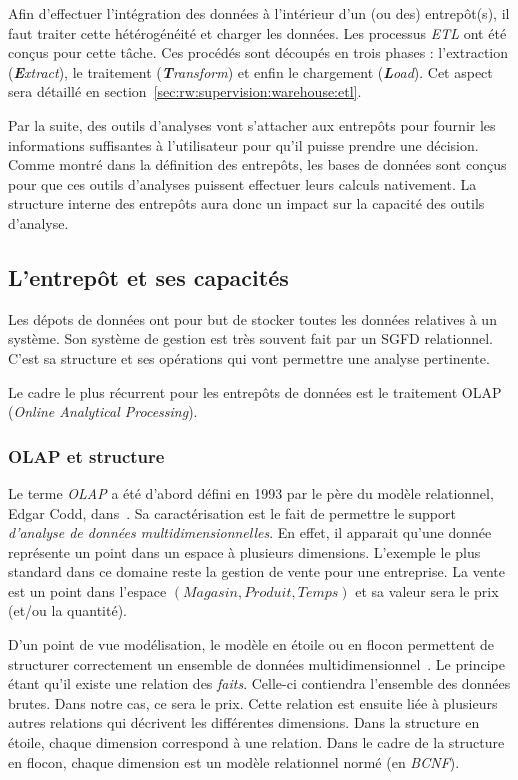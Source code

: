 Afin d'effectuer l'intégration des données à l'intérieur d'un (ou des) entrepôt(s), il faut traiter cette hétérogénéité et charger les données. Les processus \textit{ETL} ont été conçus pour cette tâche. Ces procédés sont découpés en trois phases : l'extraction (\textit{\textbf{E}xtract}), le traitement (\textit{\textbf{T}ransform}) et enfin le chargement (\textit{\textbf{L}oad}). Cet aspect sera détaillé en section~\ref{sec:rw:supervision:warehouse:etl}.

Par la suite, des outils d'analyses vont s'attacher aux entrepôts pour fournir les informations suffisantes à l'utilisateur pour qu'il puisse prendre une décision. Comme montré dans la définition des entrepôts, les bases de données sont conçus pour que ces outils d'analyses puissent effectuer leurs calculs nativement. La structure interne des entrepôts aura donc un impact sur la capacité des outils d'analyse.

\subsection{L'entrepôt et ses capacités}\label{sec:rw:supervision:warehouse:warehouse}
Les dépots de données ont pour but de stocker toutes les données relatives à un système. Son système de gestion est très souvent fait par un SGFD relationnel. C'est sa structure et ses opérations qui vont permettre une analyse pertinente.

Le cadre le plus récurrent pour les entrepôts de données est le traitement OLAP (\textit{Online Analytical Processing}). 
\subsubsection{OLAP et structure}
Le terme \textit{OLAP} a été d'abord défini en 1993 par le père du modèle relationnel, Edgar Codd, dans~\cite{Codd:olap}. Sa caractérisation est le fait de permettre le support \textit{d'analyse de données multidimensionnelles}. En effet, il apparait qu'une donnée représente un point dans un espace à plusieurs dimensions. L'exemple le plus standard dans ce domaine reste la gestion de vente pour une entreprise. La vente est un point dans l'espace $(Magasin, Produit, Temps)$ et sa valeur sera le prix (et/ou la quantité). 

D'un point de vue modélisation, le modèle en étoile ou en flocon permettent de structurer correctement un ensemble de données multidimensionnel~\cite{Levene:snowflake}. Le principe étant qu'il existe une relation des \textit{faits}. Celle-ci contiendra l'ensemble des données brutes. Dans notre cas, ce sera le prix. Cette relation est ensuite liée à plusieurs autres relations qui décrivent les différentes dimensions. Dans la structure en étoile, chaque dimension correspond à une relation. Dans le cadre de la structure en flocon, chaque dimension est un modèle relationnel normé (en \textit{BCNF}). 
